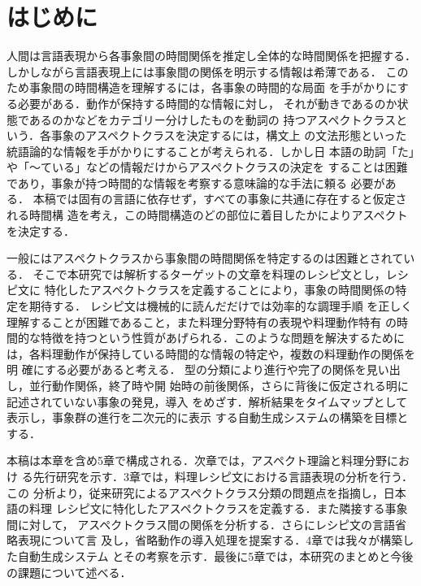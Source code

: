 

\maketitle
\thispagestyle{empty}

\section{はじめに}

人間は言語表現から各事象間の時間関係を推定し全体的な時間関係を把握する．
しかしながら言語表現上には事象間の関係を明示する情報は希薄である．
このため事象間の時間構造を理解するには，各事象の時間的な局面
を手がかりにする必要がある．動作が保持する時間的な情報に対し，
それが動きであるのか状態であるのかなどをカテゴリー分けしたものを動詞の
持つアスペクトクラスという．各事象のアスペクトクラスを決定するには，構文上
の文法形態といった統語論的な情報を手がかりにすることが考えられる．しかし日
本語の助詞「た」や「〜ている」などの情報だけからアスペクトクラスの決定を
することは困難であり，事象が持つ時間的な情報を考察する意味論的な手法に頼る
必要がある．
本稿では固有の言語に依存せず，すべての事象に共通に存在すると仮定される時間構
造を考え，この時間構造のどの部位に着目したかによりアスペクトを決定する．

一般にはアスペクトクラスから事象間の時間関係を特定するのは困難とされている．
そこで本研究では解析するターゲットの文章を料理のレシピ文とし，レシピ文に
特化したアスペクトクラスを定義することにより，事象の時間関係の特定を期待する．
レシピ文は機械的に読んだだけでは効率的な調理手順
を正しく理解することが困難であること，また料理分野特有の表現や料理動作特有
の時間的な特徴を持つという性質があげられる．このような問題を解決するために
は，各料理動作が保持している時間的な情報の特定や，複数の料理動作の関係を明
確にする必要があると考える．
型の分類により進行や完了の関係を見い出し，並行動作関係，終了時や開
始時の前後関係，さらに背後に仮定される明に記述されていない事象の発見，導入
をめざす．解析結果をタイムマップとして表示し，事象群の進行を二次元的に表示
する自動生成システムの構築を目標とする．

本稿は本章を含め5章で構成される．次章では，アスペクト理論と料理分野におけ
る先行研究を示す．3章では，料理レシピ文における言語表現の分析を行う．この
分析より，従来研究によるアスペクトクラス分類の問題点を指摘し，日本語の料理
レシピ文に特化したアスペクトクラスを定義する．また隣接する事象間に対して，
アスペクトクラス間の関係を分析する．さらにレシピ文の言語省略表現について言
及し，省略動作の導入処理を提案する．4章では我々が構築した自動生成システム
とその考察を示す．最後に5章では，本研究のまとめと今後の課題について述べる．


